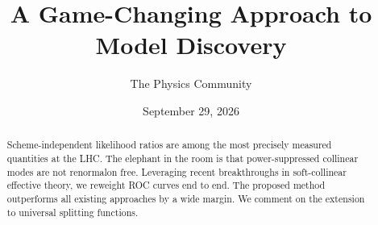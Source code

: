 \documentclass[11pt]{article}
\title{A Game-Changing Approach to Model Discovery}
\author{The Physics Community}
\date{September 29, 2026}
\numberwithin{equation}{section}
\theoremstyle{definition}
\theoremstyle{remark}
\begin{document}
\maketitle
\begin{abstract}
Scheme-independent likelihood ratios are among the most precisely
measured quantities at the LHC. The elephant in the room is that
power-suppressed collinear modes are not renormalon free. Leveraging
recent breakthroughs in soft-collinear effective theory, we reweight ROC
curves end to end. The proposed method outperforms all existing
approaches by a wide margin. We comment on the extension to universal
splitting functions.
\end{abstract}
\tableofcontents



\nocite{*}


\end{document}
